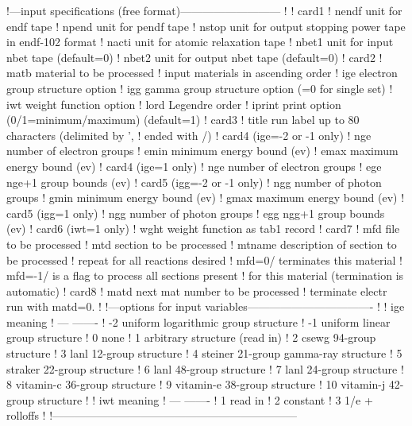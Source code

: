 \small
\begin{ccode}

   !---input specifications (free format)---------------------------
   !
   ! card1
   !    nendf   unit for endf tape
   !    npend   unit for pendf tape
   !    nstop   unit for output stopping power tape in endf-102 format
   !    nacti   unit for atomic relaxation tape
   !    nbet1   unit for input nbet tape (default=0)
   !    nbet2   unit for output nbet tape (default=0)
   ! card2
   !    matb    material to be processed
   !            input materials in ascending order
   !    ige     electron group structure option
   !    igg     gamma group structure option (=0 for single set)
   !    iwt     weight function option
   !    lord    Legendre order
   !    iprint  print option (0/1=minimum/maximum) (default=1)
   ! card3
   !    title   run label up to 80 characters (delimited by ',
   !            ended with /)
   ! card4      (ige=-2 or -1 only)
   !    nge     number of electron groups
   !    emin    minimum energy bound (ev)
   !    emax    maximum energy bound (ev)
   ! card4      (ige=1 only)
   !    nge     number of electron groups
   !    ege     nge+1 group bounds (ev)
   ! card5      (igg=-2 or -1 only)
   !    ngg     number of photon groups
   !    gmin    minimum energy bound (ev)
   !    gmax    maximum energy bound (ev)
   ! card5      (igg=1 only)
   !    ngg     number of photon groups
   !    egg     ngg+1 group bounds (ev)
   ! card6      (iwt=1 only)
   !    wght    weight function as tab1 record
   ! card7
   !    mfd     file to be processed
   !    mtd     section to be processed
   !    mtname  description of section to be processed
   !            repeat for all reactions desired
   !            mfd=0/ terminates this material
   !            mfd=-1/ is a flag to process all sections present
   !            for this material  (termination is automatic)
   ! card8
   !    matd    next mat number to be processed
   !            terminate electr run with matd=0.
   !
   !---options for input variables----------------------------------
   !
   !        ige     meaning
   !        ---     -------
   !        -2      uniform logarithmic group structure
   !        -1      uniform linear group structure
   !         0      none
   !         1      arbitrary structure (read in)
   !         2      csewg 94-group structure
   !         3      lanl 12-group structure
   !         4      steiner 21-group gamma-ray structure
   !         5      straker 22-group structure
   !         6      lanl 48-group structure
   !         7      lanl 24-group structure
   !         8      vitamin-c 36-group structure
   !         9      vitamin-e 38-group structure
   !         10     vitamin-j 42-group structure
   !
   !        iwt     meaning
   !        ---     -------
   !         1      read in
   !         2      constant
   !         3      1/e + rolloffs
   !
   !------------------------------------------------------------------

\end{ccode}
\normalsize


